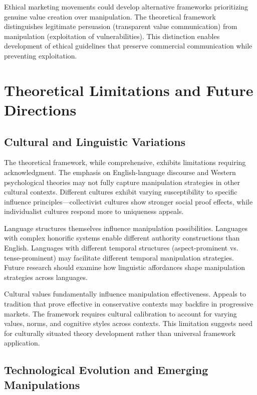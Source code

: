 Ethical marketing movements could develop alternative frameworks prioritizing genuine value creation over manipulation. The theoretical framework distinguishes legitimate persuasion (transparent value communication) from manipulation (exploitation of vulnerabilities). This distinction enables development of ethical guidelines that preserve commercial communication while preventing exploitation.

\section{Theoretical Limitations and Future Directions}
\label{sec:limitations}

\subsection{Cultural and Linguistic Variations}

The theoretical framework, while comprehensive, exhibits limitations requiring acknowledgment. The emphasis on English-language discourse and Western psychological theories may not fully capture manipulation strategies in other cultural contexts. Different cultures exhibit varying susceptibility to specific influence principles—collectivist cultures show stronger social proof effects, while individualist cultures respond more to uniqueness appeals.

Language structures themselves influence manipulation possibilities. Languages with complex honorific systems enable different authority constructions than English. Languages with different temporal structures (aspect-prominent vs. tense-prominent) may facilitate different temporal manipulation strategies. Future research should examine how linguistic affordances shape manipulation strategies across languages.

Cultural values fundamentally influence manipulation effectiveness. Appeals to tradition that prove effective in conservative contexts may backfire in progressive markets. The framework requires cultural calibration to account for varying values, norms, and cognitive styles across contexts. This limitation suggests need for culturally situated theory development rather than universal framework application.

\subsection{Technological Evolution and Emerging Manipulations}

